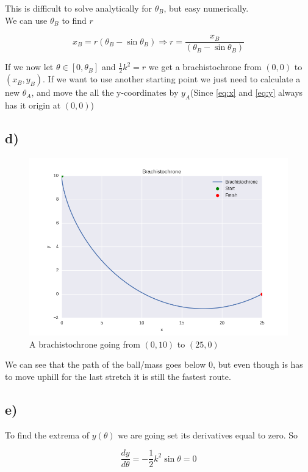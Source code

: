 \documentclass[a4paper,norsk, 10pt]{article}
\begin{document}
This is difficult to solve analytically for $\theta_B$, but easy numerically.\\

We can use $\theta_ B$ to find $r$

$$
x_B = r(\theta_B - \sin\theta_B) \Rightarrow r = \frac{x_B}{(\theta_B - \sin\theta_B)}
$$

If we now let $\theta \in [0,\theta_B]$ and $\frac{1}{2}k^2 = r$ we get a brachistochrone from $(0,0)$ to $(x_B,y_B)$. If we want to use another starting point we just need to calculate a new $\theta_A$, and move the all the y-coordinates by $y_A$(Since \ref{eq:x} and \ref{eq:y} always has it origin at $(0,0)$)

\subsection*{d)}
\begin{figure}[H]
\centering
\includegraphics[scale=0.5]{brach.png}
\caption{A brachistochrone going from $(0,10)$ to $(25,0)$}
\end{figure}

We can see that the path of the ball/mass goes below 0, but even though is has to move uphill for the last stretch it is still the fastest route.

\subsection*{e)}
To find the extrema of $y(\theta)$ we are going set its derivatives equal to zero. So

$$
\frac{dy}{d\theta} = -\frac{1}{2}k^2\sin\theta = 0
$$
\end{document}
